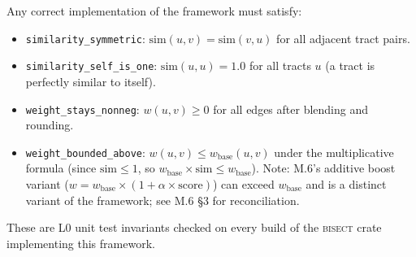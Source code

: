 Any correct implementation of the framework must satisfy:
\begin{itemize}
  \item \texttt{similarity\_symmetric}: $\mathrm{sim}(u,v) = \mathrm{sim}(v,u)$
    for all adjacent tract pairs.
  \item \texttt{similarity\_self\_is\_one}: $\mathrm{sim}(u,u) = 1.0$ for all
    tracts $u$ (a tract is perfectly similar to itself).
  \item \texttt{weight\_stays\_nonneg}: $w(u,v) \geq 0$ for all edges after
    blending and rounding.
  \item \texttt{weight\_bounded\_above}: $w(u,v) \leq w_{\mathrm{base}}(u,v)$
    under the multiplicative formula (since $\mathrm{sim} \leq 1$, so
    $w_{\mathrm{base}} \times \mathrm{sim} \leq w_{\mathrm{base}}$).
    Note: M.6's additive boost variant ($w = w_{\mathrm{base}} \times (1 + \alpha \times
    \mathrm{score})$) can exceed $w_{\mathrm{base}}$ and is a distinct variant of
    the framework; see M.6 §3 for reconciliation.
\end{itemize}

These are L0 unit test invariants checked on every build of the \textsc{bisect}
crate implementing this framework.

